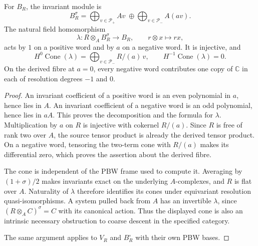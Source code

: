 \begin{proposition}
\label{rpd:prop:invariants}
For $B_R$, the invariant module is
\[
 B_R^\sigma=\bigoplus_{v\in\mathcal P_+}A v
       \;\oplus\bigoplus_{v\in\mathcal P_-}A(av).
\]
The natural field homomorphism
\[
 \lambda:R\otimes_A B_R^\sigma\longrightarrow B_R,
 \qquad r\otimes x\longmapsto rx,
\]
acts by $1$ on a positive word and by $a$ on a negative word. It is
injective, and
\[
 H^0\operatorname{Cone}(\lambda)
   =\bigoplus_{v\in\mathcal P_-}R/(a)\,v,
 \qquad H^{-1}\operatorname{Cone}(\lambda)=0.
\]
On the derived fibre at $a=0$, every negative word contributes one
copy of $\mathbb C$ in each of resolution degrees $-1$ and $0$.
\end{proposition}
\begin{proof}
An invariant coefficient of a positive word is an even polynomial in
$a$, hence lies in $A$. An invariant coefficient of a negative word is
an odd polynomial, hence lies in $aA$. This proves the decomposition
and the formula for $\lambda$. Multiplication by $a$ on $R$ is
injective with cokernel $R/(a)$. Since $R$ is free of rank two over
$A$, the source tensor product is already the derived tensor product.
On a negative word, tensoring the two-term cone with $R/(a)$ makes
its differential zero,
which proves the assertion about the derived fibre.

The cone is independent of the PBW frame used to compute it.
Averaging by $(1+\sigma)/2$ makes invariants exact on the underlying
$A$-complexes, and $R$ is flat over $A$. Naturality of $\lambda$
therefore identifies its cones under equivariant resolution
quasi-isomorphisms. A system pulled back from $A$ has an invertible
$\lambda$, since $(R\otimes_A C)^\sigma=C$ with its canonical
action. Thus the displayed cone is also an intrinsic necessary
obstruction to coarse descent in the specified category.

The same argument applies to $V_R$ and $B_R^\circ$ with their own
PBW bases.\qedhere
\end{proof}

